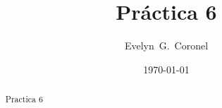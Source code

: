 



\title{Práctica 6}
\author{Evelyn~G.~Coronel}


\date[]{\lowercase{\today}} %

\begin{abstract}
Practica 6
\end{abstract} 
\maketitle
%



